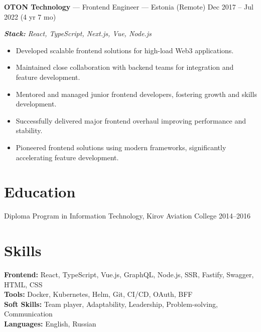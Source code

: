 \documentclass[a4paper,9pt]{article}
\begin{document}
\textbf{OTON Technology} --- Frontend Engineer --- Estonia (Remote) \hfill Dec 2017 -- Jul 2022 (4 yr 7 mo)

\textit{\textbf{Stack:} React, TypeScript, Next.js, Vue, Node.js}
\begin{itemize}[leftmargin=*]
  \item Developed scalable frontend solutions for high-load Web3 applications.
  \item Maintained close collaboration with backend teams for integration and feature development.
  \item Mentored and managed junior frontend developers, fostering growth and skills development.
  \item Successfully delivered major frontend overhaul improving performance and stability.
  \item Pioneered frontend solutions using modern frameworks, significantly accelerating feature development.
\end{itemize}

\section{Education}
Diploma Program in Information Technology, Kirov Aviation College \hfill 2014--2016

\section{Skills}
\textbf{Frontend:} React, TypeScript, Vue.js, GraphQL, Node.js, SSR, Fastify, Swagger, HTML, CSS\\
\textbf{Tools:} Docker, Kubernetes, Helm, Git, CI/CD, OAuth, BFF\\
\textbf{Soft Skills:} Team player, Adaptability, Leadership, Problem-solving, Communication\\
\textbf{Languages:} English, Russian
\end{document}
